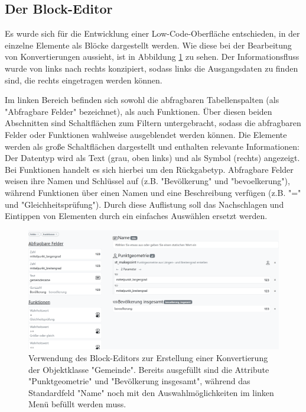 \subsection{Der Block-Editor}

Es wurde sich für die Entwicklung einer Low-Code-Oberfläche entschieden, in der einzelne Elemente als Blöcke dargestellt werden. Wie diese bei der Bearbeitung von Konvertierungen aussieht, ist in Abbildung \ref{fig:buffet-simple} zu sehen. Der Informationsfluss wurde von links nach rechts konzipiert, sodass links die Ausgangsdaten zu finden sind, die rechts eingetragen werden können.

\pskip
Im linken Bereich befinden sich sowohl die abfragbaren Tabellenspalten (als "Abfragbare Felder" bezeichnet), als auch Funktionen. Über diesen beiden Abschnitten sind Schaltflächen zum Filtern untergebracht, sodass die abfragbaren Felder oder Funktionen wahlweise ausgeblendet werden können. Die Elemente werden als große Schaltflächen dargestellt und enthalten relevante Informationen: Der Datentyp wird als Text (grau, oben links) und als Symbol (rechts) angezeigt. Bei Funktionen handelt es sich hierbei um den Rückgabetyp. Abfragbare Felder weisen ihre Namen und Schlüssel auf (z.B. "Bevölkerung" und "bevoelkerung"), während Funktionen über einen Namen und eine Beschreibung verfügen (z.B. "=" und "Gleichheitsprüfung"). Durch diese Auflistung soll das Nachschlagen und Eintippen von Elementen durch ein einfaches Auswählen ersetzt werden.

\begin{figure}[ht]
  \centering
  \includegraphics[width=.95\textwidth]{assets/buffet-simple.png}
  \caption[Verwendung des Block-Editors zur Erstellung einer Konvertierung]{Verwendung des Block-Editors zur Erstellung einer Konvertierung der Objektklasse "Gemeinde". Bereits ausgefüllt sind die Attribute "Punktgeometrie" und "Bevölkerung insgesamt", während das Standardfeld "Name" noch mit den Auswahlmöglichkeiten im linken Menü befüllt werden muss.}
  \label{fig:buffet-simple}
\end{figure}

